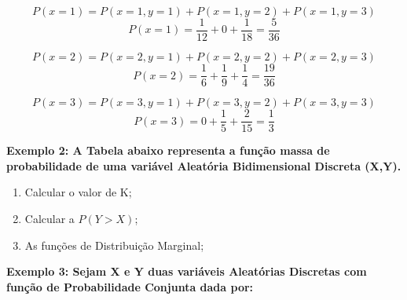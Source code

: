 \documentclass[a4paper,12pt]{report}
\begin{document}
{$$P(x=1) = P(x=1,y=1)+P(x=1,y=2)+P(x=1,y=3)$$
$$P(x=1) = \frac{1}{12}+ 0 + \frac{1}{18} = \frac{5}{36}$$

$$P(x=2) = P(x=2,y=1)+P(x=2,y=2)+P(x=2,y=3)$$
$$P(x=2) = \frac{1}{6}+ \frac{1}{9} + \frac{1}{4} = \frac{19}{36}$$

$$P(x=3) = P(x=3,y=1)+P(x=3,y=2)+P(x=3,y=3)$$
$$P(x=3) = 0+ \frac{1}{5} + \frac{2}{15} = \frac{1}{3}$$


\textbf{Exemplo 2: A Tabela abaixo representa a função massa de
probabilidade de uma variável Aleatória Bidimensional Discreta
(X,Y).}


\begin{table}[!htb]
\end{table}

\newpage

\begin{enumerate}
    \item Calcular o valor de K;
    \item Calcular a $P(Y>X)$;
    \item As funções de Distribuição Marginal;
\end{enumerate}


\textbf{Exemplo 3: Sejam X e Y duas variáveis Aleatórias Discretas
com função de Probabilidade Conjunta dada por:}

\begin{table}[!htb]
\end{table}

}
\end{document}
